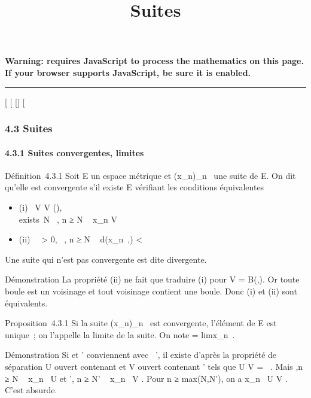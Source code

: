 \documentclass[]{article}
\title{Suites}
\author{}
\date{}
\begin{document}
\maketitle

\textbf{Warning: 
requires JavaScript to process the mathematics on this page.\\ If your
browser supports JavaScript, be sure it is enabled.}

\begin{center}\rule{3in}{0.4pt}\end{center}

[
[
[]
[

\subsubsection{4.3 Suites}

\paragraph{4.3.1 Suites convergentes, limites}

Définition~4.3.1 Soit E un espace métrique et
(x_n)_n\in{}~ une suite de E. On dit qu'elle est
convergente s'il existe \ell \in E vérifiant les conditions équivalentes

\begin{itemize}
\itemsep1pt\parskip0pt
\item
  (i) \forall~V \in V (\ell), \\exists~N
  \in {}~, n ≥ N \rigtharrow~ x_n \in V
\item
  (ii) \forall~~\epsilon > 0,
  \existsN \in {}~, n ≥ N \rigtharrow~ d(x_n~,\ell)
  < \epsilon
\end{itemize}

Une suite qui n'est pas convergente est dite divergente.

Démonstration La propriété (ii) ne fait que traduire (i) pour V =
B(\ell,\epsilon). Or toute boule est un voisinage et tout voisinage contient une
boule. Donc (i) et (ii) sont équivalents.

Proposition~4.3.1 Si la suite (x_n)_n\in{}~ est
convergente, l'élément \ell de E est unique~; on l'appelle la limite de la
suite. On note \ell = limx_n~.

Démonstration Si \ell et \ell' conviennent avec \ell\neq~\ell', il existe d'après la
propriété de séparation U ouvert contenant \ell et V ouvert contenant \ell'
tels que U \bigcap V = \varnothing~. Mais
\existsN,\quad n ≥ N \rigtharrow~ x_n~ \in
U et \existsN', n ≥ N' \rigtharrow~ x_n~ \in V . Pour n
≥ max(N,N'), on a x_n~ \in U \bigcap V . C'est
absurde.
\end{document}
